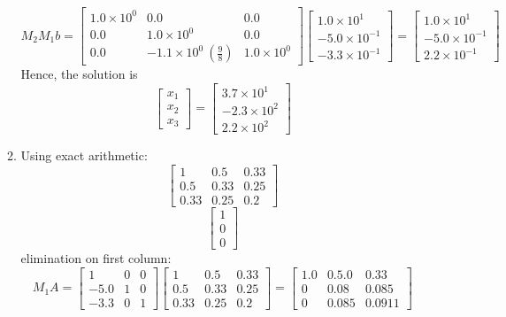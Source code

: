 \documentclass[11pt,twoside]{article}
\begin{document}
\begin{enumerate}
\begin{enumerate}
				 \[M_2 M_1 b = 
				\left. \begin{bmatrix}
				1.0\times 10^0         & 0.0 & 0.0 \\ 
				0.0 & 1.0\times 10^0  &0.0\\
				0.0 & -1.1 \times 10^0  \ (\frac{9}{8})&1.0\times 10^0  \end{bmatrix}
				 \right. 
				 \left. \begin{bmatrix} 
				1.0 \times 10^1  \\
				-5.0 \times 10^{-1}  \\
				-3.3 \times 10^{-1} \end{bmatrix} \right. = 
				 \left. \begin{bmatrix} 
				1.0 \times 10^1  \\
				-5.0 \times 10^{-1}  \\
				2.2 \times 10^{-1} \end{bmatrix} \right. \] 
				Hence, the solution is
				\[\left. \begin{bmatrix}
				x_1  \\
				x_2   \\
				x_3   \end{bmatrix} \right. =
				\left. \begin{bmatrix} 
				3.7 \times 10^1  \\
				-2.3 \times 10^{2}  \\
				2.2 \times 10^{2} \end{bmatrix} \right. \] 
		\item		Using exact arithmetic:
				\[\left. \begin{bmatrix}
				1    & 0.5  & 0.33  \\
				0.5 & 0.33 & 0.25  \\
				0.33 & 0.25 & 0.2 \end{bmatrix}
				 \right.\]
				 \[ \left. \begin{bmatrix} 
				1 \\
				0   \\
				0  \end{bmatrix} \right.  \] 
				 elimination on first column:
				\[ M_1 A = 
				\left. \begin{bmatrix}
				1& 0 & 0 \\
				-5.0& 1&0\\
				-3.3& 0 &1 \end{bmatrix}
				 \right. 
				\left. \begin{bmatrix}
				1    & 0.5  & 0.33  \\
				0.5 & 0.33 & 0.25  \\
				0.33 & 0.25 & 0.2 \end{bmatrix}
				 \right. = 
				 \left. \begin{bmatrix}
				1.0 &0.5.0 & 0.33 \\
				0&0.08& 0.085 \\
				0& 0.085 & 0.0911\end{bmatrix}
				 \right.\]
				 

\end{enumerate}
\end{enumerate}
\end{document}
